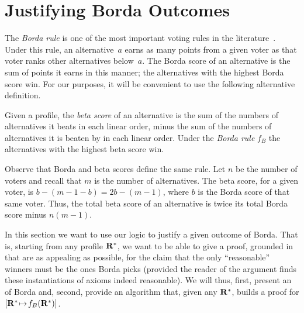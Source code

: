 \documentclass{comsoc2016}
\begin{document}
\section{Justifying Borda Outcomes}
\label{sec:borda}

The \emph{Borda rule} is one of the most important voting rules in the literature~\citep{Taylor2005}. Under this rule, an alternative~$a$ earns as many points from a given voter as that voter ranks other alternatives below~$a$. The Borda score of an alternative is the sum of points it earns in this manner; the alternatives with the highest Borda score win. For our purposes, it will be convenient to use the following alternative definition.

\begin{definition}
Given a profile, the \emph{beta score} of an alternative is the sum of the numbers of alternatives it beats in each linear order, minus the sum of the numbers of alternatives it is beaten by in each linear order.
Under the \emph{Borda rule} $f_B$ %
the alternatives with the highest beta score win.
\end{definition}

\begin{remark}\label{rem:beta-borda}
Observe that Borda %
and beta scores define the same rule. %
Let $n$ be the number of voters and recall that $m$ is the number of alternatives. The beta score, for a given voter, is $b-(m-1-b)=2b-(m-1)$, where $b$ is the Borda score of that same voter. Thus, the total beta score of an alternative is twice its total Borda score minus $n(m-1)$.
\end{remark}

In this section we want to use our logic to justify a given outcome of Borda. That is, starting from any profile $\mathbf{R}^*$, we want to be able to give a proof, grounded in \txtlaxioms{} that are as appealing as possible, for the claim that the only “reasonable” winners must be the ones Borda picks (provided the reader of the argument finds these instantiations of axioms indeed reasonable). We will thus, first, present an \laxiomatisation{} of Borda and, second, provide an algorithm that, given any $\mathbf{R}^*$, builds a proof for $\lato[\tprof][f_B(\tprof)]$.
\end{document}
